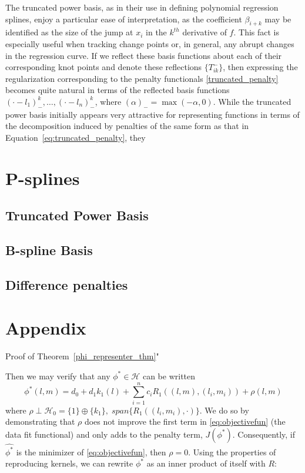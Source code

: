 \documentclass[12pt]{article}
\theoremstyle{definition}
\begin{document}
The truncated power basis, as in their use in defining polynomial regression splines, enjoy a particular ease of interpretation, as the coefficient $\beta_{i+k}$ may be identified as the size of the jump at $x_i$ in the $k^{th}$ derivative of $f$. This fact is especially useful when tracking change points or, in general, any abrupt changes in the regression curve. If we reflect these basis functions about each of their corresponding knot points and denote these reflections $\lbrace T^-_{ik}\rbrace$, then expressing the regularization corresponding to the penalty functionals \eqref{truncated_penalty} becomes quite natural in terms of the reflected basis functions $\left(\cdot - l_1 \right)^k_-,\dots, \left(\cdot - l_n \right)^k_-$, where $\left( \alpha \right)_- = \max\left(-\alpha,0\right)$.  While the truncated power basis initially appears very attractive for representing functions in terms of the decomposition induced by penalties of the same form as that in Equation~\ref{eq:truncated_penalty}, they 

\section{P-splines}

\subsection{Truncated Power Basis}

\subsection{B-spline Basis}
\subsection{Difference penalties}






\section{Appendix}


Proof of Theorem~\ref{phi_representer_thm}"

Then we may verify that any $\phi^* \in \mathcal{H}$ can be written 
\[
\phi^*\left(l,m \right) = d_0 + d_1k_1\left(l\right) + \sum_{i=1}^n  c_i R_1\left( \left(l,m\right) , \left(l_i,m_i \right)\right) + \rho\left(l,m\right)
\]
\noindent
where $\rho \perp \mathcal{H}_0 = \lbrace 1\rbrace \oplus \lbrace k_1\rbrace,\; span\lbrace R_1\left(\left(l_i, m_i \right),\cdot \right)  \rbrace$. We do so by demonstrating that  $\rho$ does not improve the first term in \eqref{eq:objectivefun} (the data fit functional) and only adds to the penalty term, $J\left(\phi^*\right)$. Consequently, if $\hat{\phi^*}$ is the minimizer of \eqref{eq:objectivefun}, then $\rho = 0$. Using the properties of reproducing kernels, we can rewrite $\phi^*$ as an inner product of itself with $R$:
 
\end{document}
